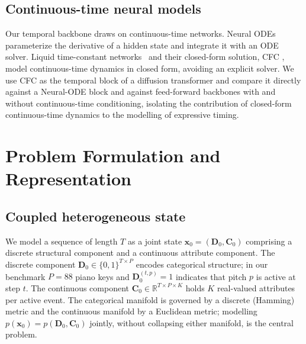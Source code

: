 \documentclass[review]{elsarticle}
\begin{document}
\subsection{Continuous-time neural models}
Our temporal backbone draws on continuous-time networks. Neural ODEs~\cite{chen2018neuralode}
parameterize the derivative of a hidden state and integrate it with an ODE solver. Liquid
time-constant networks~\cite{hasani2021ltc} and their closed-form solution, CFC
\cite{hasani2022cfc}, model continuous-time dynamics in closed form, avoiding an explicit
solver. We use CFC as the temporal block of a diffusion transformer and compare it
directly against a Neural-ODE block and against feed-forward backbones with and without
continuous-time conditioning, isolating the contribution of closed-form continuous-time
dynamics to the modelling of expressive timing.

\section{Problem Formulation and Representation}
\label{sec:formulation}

\subsection{Coupled heterogeneous state}
We model a sequence of length $T$ as a joint state $\mathbf{x}_0=(\mathbf{D}_0,\mathbf{C}_0)$
comprising a discrete structural component and a continuous attribute component. The
discrete component $\mathbf{D}_0\in\{0,1\}^{T\times P}$ encodes categorical structure; in
our benchmark $P=88$ piano keys and $\mathbf{D}_0^{(t,p)}=1$ indicates that pitch $p$ is
active at step $t$. The continuous component $\mathbf{C}_0\in\mathbb{R}^{T\times P\times K}$
holds $K$ real-valued attributes per active event. The categorical manifold is governed by
a discrete (Hamming) metric and the continuous manifold by a Euclidean metric; modelling
$p(\mathbf{x}_0)=p(\mathbf{D}_0,\mathbf{C}_0)$ jointly, without collapsing either manifold,
is the central problem.
\end{document}
